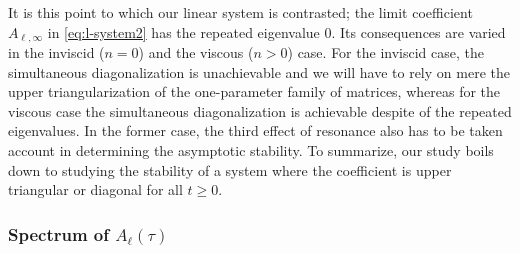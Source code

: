 \documentclass[a4paper,11pt]{article}
\theoremstyle{remark}
\begin{document}
It is this point to which our linear system is contrasted; the limit coefficient $A_{\ell,\infty}$ in \eqref{eq:l-system2} has the repeated eigenvalue $0$. Its consequences are varied in the inviscid ($n=0$) and the viscous ($n>0$) case. For the inviscid case, the simultaneous diagonalization is unachievable and we will have to rely on mere the upper triangularization of the one-parameter family of matrices, whereas for the viscous case the simultaneous diagonalization is achievable despite of the repeated eigenvalues. In the former case, the third effect of resonance also has to be taken account in determining the asymptotic stability. To summarize, our study boils down to studying the stability of a system where the coefficient is upper triangular or diagonal for all $t\ge0$.

\subsubsection{Spectrum of $A_\ell(\tau)$}
\end{document}
